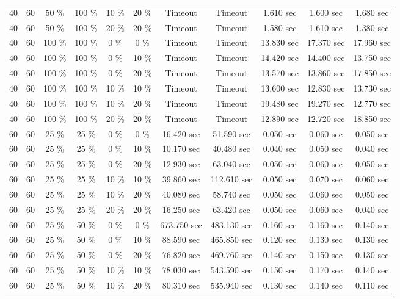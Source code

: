 \documentclass{article}
\begin{document}
\begin{longtable}[]{@{}ccccccccccc@{}}
40 & 60 & 50 \% & 100 \% & 10 \% & 20 \% & Timeout & Timeout & 1.610 sec & 1.600 sec & 1.680 sec \\
40 & 60 & 50 \% & 100 \% & 20 \% & 20 \% & Timeout & Timeout & 1.580 sec & 1.610 sec & 1.380 sec \\
40 & 60 & 100 \% & 100 \% & 0 \% & 0 \% & Timeout & Timeout & 13.830 sec & 17.370 sec & 17.960 sec \\
40 & 60 & 100 \% & 100 \% & 0 \% & 10 \% & Timeout & Timeout & 14.420 sec & 14.400 sec & 13.750 sec \\
40 & 60 & 100 \% & 100 \% & 0 \% & 20 \% & Timeout & Timeout & 13.570 sec & 13.860 sec & 17.850 sec \\
40 & 60 & 100 \% & 100 \% & 10 \% & 10 \% & Timeout & Timeout & 13.600 sec & 12.830 sec & 13.730 sec \\
40 & 60 & 100 \% & 100 \% & 10 \% & 20 \% & Timeout & Timeout & 19.480 sec & 19.270 sec & 12.770 sec \\
40 & 60 & 100 \% & 100 \% & 20 \% & 20 \% & Timeout & Timeout & 12.890 sec & 12.720 sec & 18.850 sec \\
60 & 60 & 25 \% & 25 \% & 0 \% & 0 \% & 16.420 sec & 51.590 sec & 0.050 sec & 0.060 sec & 0.050 sec \\
60 & 60 & 25 \% & 25 \% & 0 \% & 10 \% & 10.170 sec & 40.480 sec & 0.040 sec & 0.050 sec & 0.040 sec \\
60 & 60 & 25 \% & 25 \% & 0 \% & 20 \% & 12.930 sec & 63.040 sec & 0.050 sec & 0.060 sec & 0.050 sec \\
60 & 60 & 25 \% & 25 \% & 10 \% & 10 \% & 39.860 sec & 112.610 sec & 0.050 sec & 0.070 sec & 0.060 sec \\
60 & 60 & 25 \% & 25 \% & 10 \% & 20 \% & 40.080 sec & 58.740 sec & 0.050 sec & 0.060 sec & 0.050 sec \\
60 & 60 & 25 \% & 25 \% & 20 \% & 20 \% & 16.250 sec & 63.420 sec & 0.050 sec & 0.060 sec & 0.040 sec \\
60 & 60 & 25 \% & 50 \% & 0 \% & 0 \% & 673.750 sec & 483.130 sec & 0.160 sec & 0.160 sec & 0.140 sec \\
60 & 60 & 25 \% & 50 \% & 0 \% & 10 \% & 88.590 sec & 465.850 sec & 0.120 sec & 0.130 sec & 0.130 sec \\
60 & 60 & 25 \% & 50 \% & 0 \% & 20 \% & 76.820 sec & 469.760 sec & 0.140 sec & 0.150 sec & 0.130 sec \\
60 & 60 & 25 \% & 50 \% & 10 \% & 10 \% & 78.030 sec & 543.590 sec & 0.150 sec & 0.170 sec & 0.140 sec \\
60 & 60 & 25 \% & 50 \% & 10 \% & 20 \% & 80.310 sec & 535.940 sec & 0.130 sec & 0.140 sec & 0.110 sec \\

\end{longtable}
\end{document}
